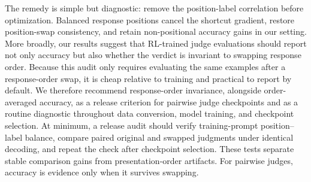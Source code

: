 \documentclass[11pt]{article}
\begin{document}
The remedy is simple but diagnostic: remove the position-label correlation before optimization. Balanced response positions cancel the shortcut gradient, restore position-swap consistency, and retain non-positional accuracy gains in our setting. More broadly, our results suggest that RL-trained judge evaluations should report not only accuracy but also whether the verdict is invariant to swapping response order. Because this audit only requires evaluating the same examples after a response-order swap, it is cheap relative to training and practical to report by default. We therefore recommend response-order invariance, alongside order-averaged accuracy, as a release criterion for pairwise judge checkpoints and as a routine diagnostic throughout data conversion, model training, and checkpoint selection. At minimum, a release audit should verify training-prompt position--label balance, compare paired original and swapped judgments under identical decoding, and repeat the check after checkpoint selection. These tests separate stable comparison gains from presentation-order artifacts. For pairwise judges, accuracy is evidence only when it survives swapping.

\clearpage


\clearpage
\def\blackboxappendix{1}

\end{document}
